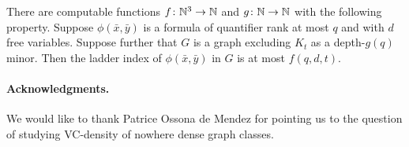  \begin{theorem}\label{thm:new-stable}
There are computable functions $f\colon \mathbb{N}^3\to\mathbb{N}$ and $g\colon\mathbb{N}\to\mathbb{N}$ with the following property.
Suppose $\phi(\bar x,\bar y)$ is a formula of quantifier rank at most $q$ and with $d$ free variables.
Suppose further that $G$ is a graph excluding $K_t$ as a depth-$g(q)$ minor. Then the ladder index of $\phi(\bar x,\bar y)$ in $G$ is at most $f(q,d,t)$.
 \end{theorem}




\paragraph{Acknowledgments.} We would like to
thank Patrice Ossona de Mendez for pointing us to the
question of studying VC-density of nowhere dense graph
classes.


